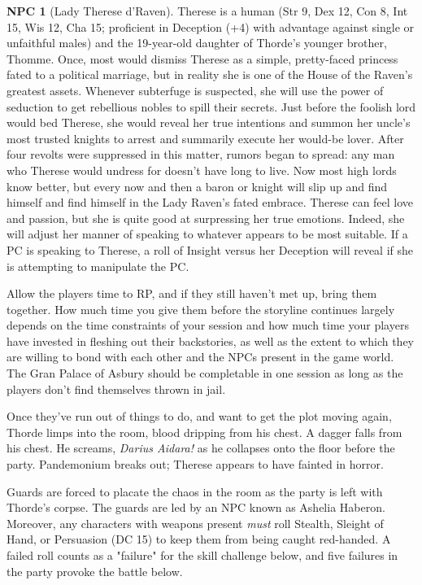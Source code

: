 \documentclass{report}
\theoremstyle{definition}
\newtheorem{npc}{NPC}[chapter]
\begin{document}
\begin{npc}[Lady Therese d'Raven]
Therese is a human (Str 9, Dex 12, Con 8, Int 15, Wis 12, Cha 15; proficient in Deception (+4) with advantage against single or unfaithful males) and the 19-year-old daughter of Thorde's younger brother, Thomme. Once, most would dismiss Therese as a simple, pretty-faced princess fated to a political marriage, but in reality she is one of the House of the Raven's greatest assets. Whenever subterfuge is suspected, she will use the power of seduction to get rebellious nobles to spill their secrets. Just before the foolish lord would bed Therese, she would reveal her true intentions and summon her uncle's most trusted knights to arrest and summarily execute her would-be lover. After four revolts were suppressed in this matter, rumors began to spread: any man who Therese would undress for doesn't have long to live. Now most high lords know better, but every now and then a baron or knight will slip up and find himself and find himself in the Lady Raven's fated embrace. Therese can feel love and passion, but she is quite good at surpressing her true emotions. Indeed, she will adjust her manner of speaking to whatever appears to be most suitable. If a PC is speaking to Therese, a roll of Insight versus her Deception will reveal if she is attempting to manipulate the PC.
\end{npc}
Allow the players time to RP, and if they still haven't met up, bring them together. How much time you give them before the storyline continues largely depends on the time constraints of your session and how much time your players have invested in fleshing out their backstories, as well as the extent to which they are willing to bond with each other and the NPCs present in the game world. The Gran Palace of Asbury should be completable in one session as long as the players don't find themselves thrown in jail.

Once they've run out of things to do, and want to get the plot moving again, Thorde limps into the room, blood dripping from his chest. A dagger falls from his chest. He screams, \textit{Darius Aidara!} as he collapses onto the floor before the party. Pandemonium breaks out; Therese appears to have fainted in horror.

Guards are forced to placate the chaos in the room as the party is left with Thorde's corpse. The guards are led by an NPC known as Ashelia Haberon. Moreover, any characters with weapons present \textit{must} roll Stealth, Sleight of Hand, or Persuasion (DC 15) to keep them from being caught red-handed. A failed roll counts as a "failure" for the skill challenge below, and five failures in the party provoke the battle below.
\end{document}
